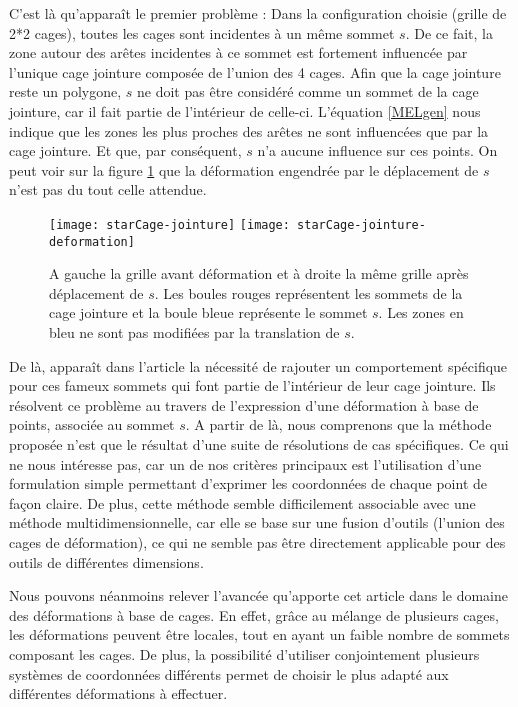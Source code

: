 C'est là qu'apparaît le premier problème : Dans la configuration
choisie (grille de 2*2 cages), toutes les cages sont incidentes à un
même sommet $s$. De ce fait, la zone autour des arêtes incidentes à ce
sommet est fortement influencée par l'unique cage jointure composée de
l'union des 4 cages. Afin que la cage jointure reste un polygone, $s$
ne doit pas être considéré comme un sommet de la cage jointure, car il
fait partie de l'intérieur de celle-ci. L'équation \ref{MELgen} nous
indique que les zones les plus proches des arêtes ne sont influencées
que par la cage jointure. Et que, par conséquent, $s$ n'a aucune
influence sur ces points. On peut voir sur la figure \ref{MELjoi} que
la déformation engendrée par le déplacement de $s$ n'est pas du tout
celle attendue.

\begin{figure}[ht]
  \begin{center}
    \texttt{[image: starCage-jointure]}
    \texttt{[image: starCage-jointure-deformation]}
    \caption{A gauche la grille avant déformation et à droite la même
      grille après déplacement de $s$. Les boules rouges représentent
      les sommets de la cage jointure et la boule bleue représente le
      sommet $s$. Les zones en bleu ne sont pas modifiées par la
      translation de $s$.}
    \label{MELjoi}
  \end{center}
\end{figure}

De là, apparaît dans l'article la nécessité de rajouter un
comportement spécifique pour ces fameux sommets qui font partie de
l'intérieur de leur cage jointure. Ils résolvent ce problème au
travers de l'expression d'une déformation à base de points, associée
au sommet $s$. A partir de là, nous comprenons que la méthode proposée
\cite{GPCP13} n'est que le résultat d'une suite de résolutions de cas
spécifiques. Ce qui ne nous intéresse pas, car un de nos critères
principaux est l'utilisation d'une formulation simple permettant
d'exprimer les coordonnées de chaque point de façon claire. De plus,
cette méthode semble difficilement associable avec une méthode
multidimensionnelle, car elle se base sur une fusion d'outils (l'union
des cages de déformation), ce qui ne semble pas être directement
applicable pour des outils de différentes dimensions.

Nous pouvons néanmoins relever l'avancée qu'apporte cet article dans
le domaine des déformations à base de cages. En effet, grâce au
mélange de plusieurs cages, les déformations peuvent être locales,
tout en ayant un faible nombre de sommets composant les cages. De
plus, la possibilité d'utiliser conjointement plusieurs systèmes de
coordonnées différents permet de choisir le plus adapté aux
différentes déformations à effectuer.

